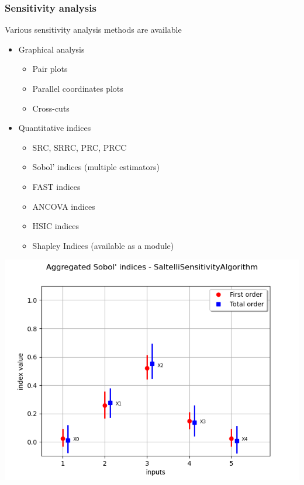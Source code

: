 \documentclass{beamer}
\begin{document}



\begin{frame}
\frametitle{Sensitivity analysis}

\begin{minipage}[c]{0.6\textwidth}


Various sensitivity analysis methods are available
\begin{itemize}
\item Graphical analysis
\begin{itemize}
\item Pair plots
\item Parallel coordinates plots
\item Cross-cuts
\end{itemize}
\vspace{15pt}
\item Quantitative indices 
\begin{itemize}
\item SRC, SRRC, PRC, PRCC
\item Sobol' indices (multiple estimators)
\item FAST indices
\item ANCOVA indices
\item HSIC indices
\item Shapley Indices (available as a module)

\end{itemize}
\end{itemize}

\end{minipage}%
\begin{minipage}[c]{0.45\textwidth}
\includegraphics[width=1.\textwidth]{figures/SobolEx.png}
\end{minipage}

\end{frame}
\end{document}
